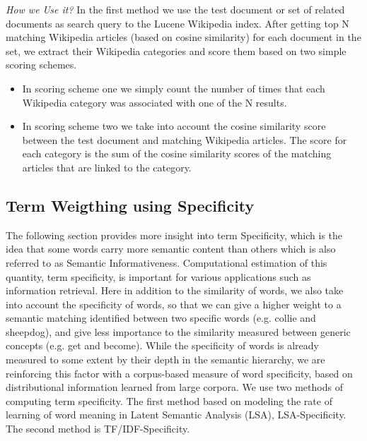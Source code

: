 \textit{How we Use it?}
In the first method we use the test document or set of related documents as search query to the Lucene Wikipedia index. After getting top N matching Wikipedia articles (based on cosine similarity) for each document in the set, we extract their Wikipedia categories and score them based on two simple scoring schemes\citep{wiki_2}\citep{wiki_1}.
\begin{itemize}
\item In scoring scheme one we simply count the number of times that each Wikipedia category was associated with one of the N results.
\item In scoring scheme two we take into account the cosine similarity score between the test document and matching Wikipedia articles. The score for each category is the sum of the cosine similarity scores of the matching articles that are linked to the category.
\end{itemize}

\subsection{Term Weigthing using Specificity}
The following section provides more insight into term Specificity, which is the idea that some words carry more semantic content than others which is also referred to as Semantic Informativeness. Computational estimation of this quantity, term specificity, is important for various applications such as information retrieval. Here in addition to the similarity of words, we also take into account the specificity of words, so that we can give a higher weight to a semantic matching identified between two specific words (e.g. collie and sheepdog), and give less importance to the similarity measured between generic concepts (e.g. get and become). While the specificity of words is already measured to some extent by their depth in the semantic hierarchy, we are reinforcing this factor with a corpus-based measure of word specificity, based on distributional information learned from large corpora.
We use two methods of computing term specificity. The first method based on modeling the rate of learning of word meaning in Latent Semantic Analysis (LSA), LSA-Specificity. The second method is TF/IDF-Specificity\citep{spec}.

